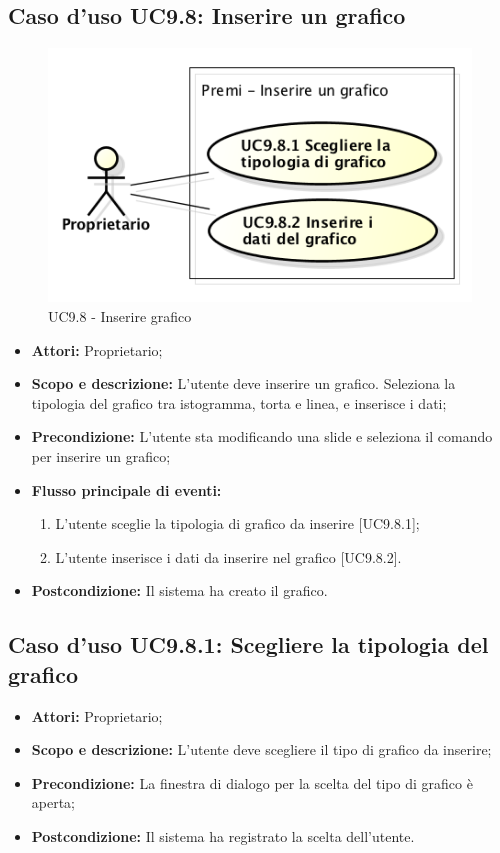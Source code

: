 \subsection{Caso d'uso UC9.8: Inserire un grafico}
\begin{figure}[h] 
	\centering 
	\includegraphics[scale=0.45] {img/UC9.8.png}
	\caption{UC9.8 - Inserire grafico} 
\end{figure}

\begin{itemize}
	\item \textbf{Attori:} Proprietario;
	\item \textbf{Scopo e descrizione:} L'utente deve inserire un grafico. Seleziona la tipologia del grafico tra istogramma, torta e linea, e inserisce i dati;
	\item \textbf{Precondizione:} L'utente sta modificando una \gls{slide} e seleziona il comando per inserire un grafico;
	\item \textbf{Flusso principale di eventi:}
	\begin{enumerate}
		\item L'utente sceglie la tipologia di grafico da inserire [UC9.8.1];
		\item L'utente inserisce i dati da inserire nel grafico [UC9.8.2].
	\end{enumerate}
	\item \textbf{Postcondizione:} Il sistema ha creato il grafico.
\end{itemize}

	\subsection{Caso d'uso UC9.8.1: Scegliere la tipologia del grafico}
	\begin{itemize}
		\item \textbf{Attori:} Proprietario;
		\item \textbf{Scopo e descrizione:} L'utente deve scegliere il tipo di grafico da inserire;
		\item \textbf{Precondizione:} La finestra di dialogo per la scelta del tipo di grafico è aperta;
		\item \textbf{Postcondizione:} Il sistema ha registrato la scelta dell'utente.
	\end{itemize}
	
